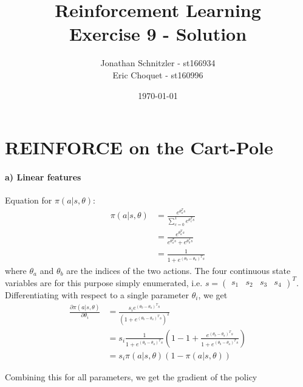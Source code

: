 \documentclass{article}
\title{Reinforcement Learning \\ Exercise 9 - Solution}
\author{Jonathan Schnitzler - st166934 \\
Eric Choquet - st160996}
\date{\today}
\begin{document}
\maketitle

\section*{REINFORCE on the Cart-Pole}

\paragraph*{a) Linear features}

Equation for $\pi(a|s, \theta)$:
\begin{align}
    \pi(a|s, \theta) &= \frac{e^{\theta_a^T s}}{\sum_{c=0}^{1} e^{\theta_c^T s}} \\
    &= \frac{e^{\theta_a^T s}}{e^{\theta_a^T s} + e^{\theta_b^T s}} \\
    &= \frac{1}{1 + e^{(\theta_b - \theta_a)^T s}}
\end{align}
where $\theta_a$ and $\theta_b$ are the indices of the two actions. The four continuous state variables are for this purpose simply enumerated, i.e. $s = \begin{pmatrix}s_1&s_2&s_3&s_4 \end{pmatrix}^T$. Differentiating with respect to a single parameter $\theta_{i}$, we get
\begin{align}
    \frac{\partial \pi(a|s, \theta)}{\partial \theta_i} &= \frac{s_i e^{(\theta_b - \theta_a)^T s}}{(1 + e^{(\theta_b - \theta_a)^T s})^2} \\
    &= s_i \frac{1}{1 + e^{(\theta_b - \theta_a)^T s}} \left( 1 - 1 + \frac{e^{(\theta_b - \theta_a)^T s}}{1 + e^{(\theta_b - \theta_a)^T s}}\right) \\
    &= s_i \pi(a|s, \theta) (1 - \pi(a|s, \theta))
\end{align}

Combining this for all parameters, we get the gradient of the policy
\end{document}
